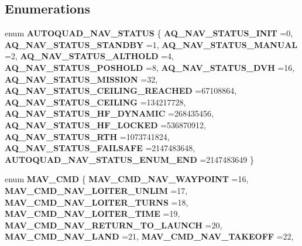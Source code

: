 \subsection*{Enumerations}
\begin{DoxyCompactItemize}
\item 
enum \textbf{ A\+U\+T\+O\+Q\+U\+A\+D\+\_\+\+N\+A\+V\+\_\+\+S\+T\+A\+T\+US} \{ \newline
\textbf{ A\+Q\+\_\+\+N\+A\+V\+\_\+\+S\+T\+A\+T\+U\+S\+\_\+\+I\+N\+IT} =0, 
\textbf{ A\+Q\+\_\+\+N\+A\+V\+\_\+\+S\+T\+A\+T\+U\+S\+\_\+\+S\+T\+A\+N\+D\+BY} =1, 
\textbf{ A\+Q\+\_\+\+N\+A\+V\+\_\+\+S\+T\+A\+T\+U\+S\+\_\+\+M\+A\+N\+U\+AL} =2, 
\textbf{ A\+Q\+\_\+\+N\+A\+V\+\_\+\+S\+T\+A\+T\+U\+S\+\_\+\+A\+L\+T\+H\+O\+LD} =4, 
\newline
\textbf{ A\+Q\+\_\+\+N\+A\+V\+\_\+\+S\+T\+A\+T\+U\+S\+\_\+\+P\+O\+S\+H\+O\+LD} =8, 
\textbf{ A\+Q\+\_\+\+N\+A\+V\+\_\+\+S\+T\+A\+T\+U\+S\+\_\+\+D\+VH} =16, 
\textbf{ A\+Q\+\_\+\+N\+A\+V\+\_\+\+S\+T\+A\+T\+U\+S\+\_\+\+M\+I\+S\+S\+I\+ON} =32, 
\textbf{ A\+Q\+\_\+\+N\+A\+V\+\_\+\+S\+T\+A\+T\+U\+S\+\_\+\+C\+E\+I\+L\+I\+N\+G\+\_\+\+R\+E\+A\+C\+H\+ED} =67108864, 
\newline
\textbf{ A\+Q\+\_\+\+N\+A\+V\+\_\+\+S\+T\+A\+T\+U\+S\+\_\+\+C\+E\+I\+L\+I\+NG} =134217728, 
\textbf{ A\+Q\+\_\+\+N\+A\+V\+\_\+\+S\+T\+A\+T\+U\+S\+\_\+\+H\+F\+\_\+\+D\+Y\+N\+A\+M\+IC} =268435456, 
\textbf{ A\+Q\+\_\+\+N\+A\+V\+\_\+\+S\+T\+A\+T\+U\+S\+\_\+\+H\+F\+\_\+\+L\+O\+C\+K\+ED} =536870912, 
\textbf{ A\+Q\+\_\+\+N\+A\+V\+\_\+\+S\+T\+A\+T\+U\+S\+\_\+\+R\+TH} =1073741824, 
\newline
\textbf{ A\+Q\+\_\+\+N\+A\+V\+\_\+\+S\+T\+A\+T\+U\+S\+\_\+\+F\+A\+I\+L\+S\+A\+FE} =2147483648, 
\textbf{ A\+U\+T\+O\+Q\+U\+A\+D\+\_\+\+N\+A\+V\+\_\+\+S\+T\+A\+T\+U\+S\+\_\+\+E\+N\+U\+M\+\_\+\+E\+ND} =2147483649
 \}
\item 
enum \textbf{ M\+A\+V\+\_\+\+C\+MD} \{ \newline
\textbf{ M\+A\+V\+\_\+\+C\+M\+D\+\_\+\+N\+A\+V\+\_\+\+W\+A\+Y\+P\+O\+I\+NT} =16, 
\textbf{ M\+A\+V\+\_\+\+C\+M\+D\+\_\+\+N\+A\+V\+\_\+\+L\+O\+I\+T\+E\+R\+\_\+\+U\+N\+L\+IM} =17, 
\textbf{ M\+A\+V\+\_\+\+C\+M\+D\+\_\+\+N\+A\+V\+\_\+\+L\+O\+I\+T\+E\+R\+\_\+\+T\+U\+R\+NS} =18, 
\textbf{ M\+A\+V\+\_\+\+C\+M\+D\+\_\+\+N\+A\+V\+\_\+\+L\+O\+I\+T\+E\+R\+\_\+\+T\+I\+ME} =19, 
\newline
\textbf{ M\+A\+V\+\_\+\+C\+M\+D\+\_\+\+N\+A\+V\+\_\+\+R\+E\+T\+U\+R\+N\+\_\+\+T\+O\+\_\+\+L\+A\+U\+N\+CH} =20, 
\textbf{ M\+A\+V\+\_\+\+C\+M\+D\+\_\+\+N\+A\+V\+\_\+\+L\+A\+ND} =21, 
\textbf{ M\+A\+V\+\_\+\+C\+M\+D\+\_\+\+N\+A\+V\+\_\+\+T\+A\+K\+E\+O\+FF} =22, 

\end{DoxyCompactItemize}
